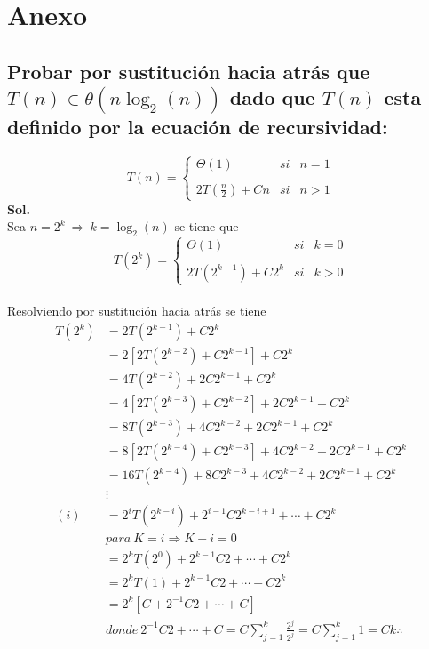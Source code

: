 \documentclass[12pt,twoside]{article}
\begin{document}
    \section{Anexo}
    \subsection{Probar por sustituci\'on hacia atr\'as que \texorpdfstring{$T(n)\in\theta(n\log_2{(n)})$}{Lg} dado que \texorpdfstring{$T(n)$}{Lg} esta definido por la ecuaci\'on de recursividad: }
        $$T(n)= \left\{ \begin{array}{lcc}
            \Theta(1) &   si  & n=1 \\
            \\ 2T(\frac{n}{2})+Cn &  si & n>1
            \end{array}
            \right.$$
        \textbf{Sol.}\\
        Sea $n=2^{k}~\Rightarrow~k=\log_2{(n)}$ se tiene que $$T(2^{k})= \left\{ \begin{array}{lcc}
                        \Theta(1) &   si  & k=0\\
                        \\ 2T(2^{k-1})+C2^{k} &  si & k>0
                        \end{array}
                \right.$$\\
        Resolviendo por sustituci\'on hacia atr\'as se tiene\\
        \begin{align}
            T(2^{k})&=2T(2^{k-1})+C2^{k}\nonumber\\
            &=2[2T(2^{k-2})+C2^{k-1}]+C2^{k}\nonumber\\
            &=4T(2^{k-2})+2C2^{k-1}+C2^{k}\nonumber\\
            &=4[2T(2^{k-3})+C2^{k-2}]+2C2^{k-1}+C2^{k}\nonumber\\
            &=8T(2^{k-3})+4C2^{k-2}+2C2^{k-1}+C2^{k}\nonumber\\
            &=8[2T(2^{k-4})+C2^{k-3}]+4C2^{k-2}+2C2^{k-1}+C2^{k}\nonumber\\
            &=16T(2^{k-4})+8C2^{k-3}+4C2^{k-2}+2C2^{k-1}+C2^{k}\nonumber\\
            &\vdots\nonumber\\
            (i)&=2^{i}T(2^{k-i})+2^{i-1}C2^{k-i+1}+\cdots+C2^{k}\nonumber\\
            & para~K=i \Rightarrow K-i=0\nonumber\\
            &=2^{k}T(2^{0})+2^{k-1}C2+\cdots+C2^{k}\nonumber\\
            &=2^{k}T(1)+2^{k-1}C2+\cdots+C2^{k}\nonumber\\
            &=2^{k}[C+2^{-1}C2+\cdots+C]\nonumber\\
            & donde~2^{-1}C2+\cdots+C = C\sum_{j=1}^{k}\frac{2^{j}}{2^{j}}=C\sum_{j=1}^{k}{1}=Ck\therefore\nonumber\\
        \end{align}
\end{document}
